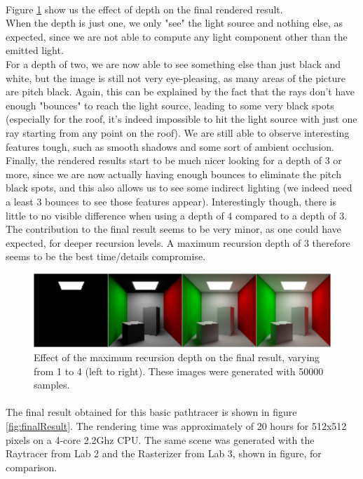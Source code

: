 \documentclass[12pt, oneside]{report}
\begin{document}
\paragraph{}Figure \ref{fig:depthComparison} show us the effect of depth on the final rendered result. \\ 
When the depth is just one, we only "see" the light source and nothing else, as expected, since we are not able to compute any light component other than the emitted light. \\ 
For a depth of two, we are now able to see something else than just black and white, but the image is still not very eye-pleasing, as many areas of the picture are pitch black. Again, this can be explained by the fact that the rays don't have enough "bounces" to reach the light source, leading to some very black spots (especially for the roof, it's indeed impossible to hit the light source with just one ray starting from any point on the roof). We are still able to observe interesting features tough, such as smooth shadows and some sort of ambient occlusion.\\ 
Finally, the rendered results start to be much nicer looking for a depth of 3 or more, since we are now actually having enough bounces to eliminate the pitch black spots, and this also allows us to see some indirect lighting (we indeed need a least 3 bounces to see those features appear). Interestingly though, there is little to no visible difference when using a depth of 4 compared to a depth of 3. The contribution to the final result seems to be very minor, as one could have expected, for deeper recursion levels. A maximum recursion depth of 3 therefore seems to be the best time/details compromise.

\begin{figure}[h]
    \centering
    \includegraphics[width=1\linewidth]{depth_test.png} 
    \caption{Effect of the maximum recursion depth on the final result, varying from 1 to 4 (left to right). These images were generated with 50000 samples.}
    \label{fig:depthComparison}
\end{figure}

\paragraph{} The final result obtained for this basic pathtracer is shown in figure \ref{fig:finalResult}. The rendering time was approximately of 20 hours for 512x512 pixels on a 4-core 2.2Ghz CPU. The same scene was generated with the Raytracer from Lab 2 and the Rasterizer from Lab 3, shown in figure, for comparison. 
\end{document}
